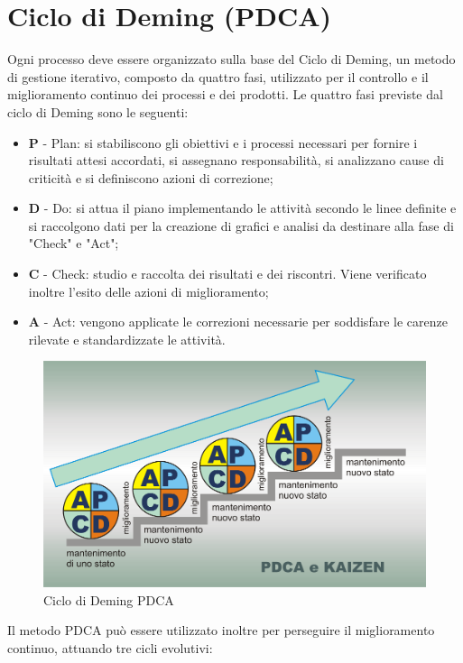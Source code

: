\clearpage
\appendix
\section{Ciclo di Deming (PDCA)}
\label{sec:ciclo_deming}
Ogni processo deve essere organizzato sulla base del Ciclo di Deming, un metodo di gestione iterativo, composto da quattro fasi, utilizzato per il controllo e il miglioramento continuo dei processi e dei prodotti.
Le quattro fasi previste dal ciclo di Deming sono le seguenti:
\begin{itemize}
	\item \textbf{P} - Plan: si stabiliscono gli obiettivi e i processi necessari per fornire i risultati attesi accordati, si assegnano responsabilità, si analizzano cause di criticità e si definiscono azioni di correzione;
	\item \textbf{D} - Do: si attua il piano implementando le attività secondo le linee definite e si raccolgono dati per la creazione di grafici e analisi da destinare alla fase di "Check" e "Act";
	\item \textbf{C} - Check: studio e raccolta dei risultati e dei riscontri. Viene verificato inoltre l'esito delle azioni di miglioramento;
	\item \textbf{A}  - Act: vengono applicate le correzioni necessarie per soddisfare le carenze rilevate e standardizzate le attività.
\end{itemize}
\begin{figure}[h]
	\includegraphics[width=1\textwidth]{../includes/pics/PDCAkaizen.png}
	\caption{Ciclo di Deming PDCA}
\end{figure}
Il metodo PDCA può essere utilizzato inoltre per perseguire il miglioramento continuo, attuando tre cicli evolutivi:

